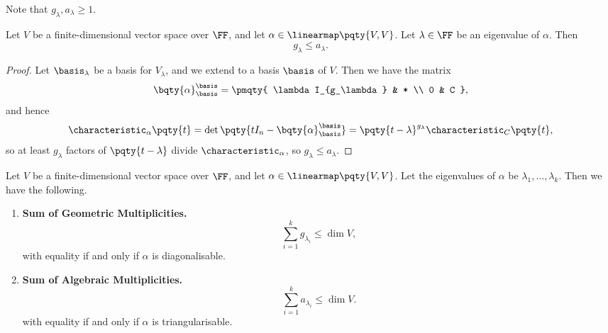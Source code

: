 Note that \(g_{\lambda}, a_{\lambda} \geq 1\).

\begin{proposition}
    \label{prop:algebraic-geometric-multiplicities}%
    Let \(V\) be a finite-dimensional vector space over \(\FF\), and let \(\alpha \in \linearmap\pqty{V, V}\). Let \(\lambda \in \FF\) be an eigenvalue of \(\alpha\). Then
    \[
        g_{\lambda} \leq a_{\lambda}.
    \]
\end{proposition}

\begin{proof}
    Let \(\basis_\lambda\) be a basis for \(V_{\lambda}\), and we extend to a basis \(\basis \) of \(V\). Then we have the matrix
    \[
        \bqty{\alpha}_{\basis}^{\basis} = \pmqty{
            \lambda I_{g_\lambda} & * \\
            0 & C
        },
    \]  
    and hence
    \[
        \characteristic_{\alpha} \pqty{t} = \det\pqty{t I_n - \bqty{\alpha}_{\basis}^{\basis}} = \pqty{t - \lambda}^{g_\lambda} \characteristic_C \pqty{t},
    \]
    so at least \(g_\lambda\) factors of \(\pqty{t - \lambda}\) divide \(\characteristic_{\alpha}\), so \(g_\lambda \leq a_\lambda\).
\end{proof}

\begin{lemma}
    \label{lem:sum-of-multiplicities}%
    Let \(V\) be a finite-dimensional vector space over \(\FF\), and let \(\alpha \in \linearmap\pqty{V, V}\). Let the eigenvalues of \(\alpha\) be \(\lambda_1, \ldots, \lambda_k\). Then we have the following.

    \begin{enumerate}[label=(\roman*)]
        \item \textbf{Sum of Geometric Multiplicities.}
        \[
            \sum_{i = 1}^{k} g_{\lambda_i} \leq \dim V,
        \]
        with equality if and only if \(\alpha\) is diagonalisable.

        \item \textbf{Sum of Algebraic Multiplicities.}
        \[
            \sum_{i = 1}^{k} a_{\lambda_i} \leq \dim V.
        \]
        with equality if and only if \(\alpha\) is triangularisable.
    \end{enumerate}
\end{lemma}

